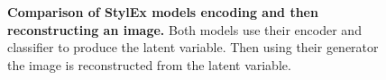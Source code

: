 \begin{figure}[h]
    \centering
  \caption{\centering \textbf{Comparison of StylEx models encoding and then reconstructing an image.} Both models use their encoder and classifier to produce the latent variable. Then using their generator the image is reconstructed from the latent variable.}
  \label{fig:PyTorch vs TensorFlow encoder}
\end{figure}

